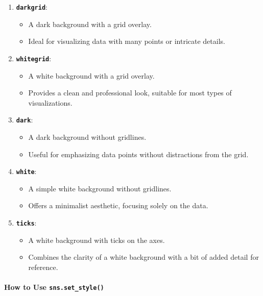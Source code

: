 \documentclass[
  letterpaper,
  DIV=11,
  numbers=noendperiod]{scrreprt}
\let\oldparagraph\paragraph
\renewcommand{\paragraph}[1]{\oldparagraph{#1}\mbox{}}
\providecommand{\tightlist}{%
  \setlength{\itemsep}{0pt}\setlength{\parskip}{0pt}}\usepackage{longtable,booktabs,array}
\begin{document}
\begin{enumerate}
\def\labelenumi{\arabic{enumi}.}
\tightlist
\item
  \textbf{\texttt{darkgrid}}:

  \begin{itemize}
  \tightlist
  \item
    A dark background with a grid overlay.
  \item
    Ideal for visualizing data with many points or intricate details.
  \end{itemize}
\item
  \textbf{\texttt{whitegrid}}:

  \begin{itemize}
  \tightlist
  \item
    A white background with a grid overlay.
  \item
    Provides a clean and professional look, suitable for most types of
    visualizations.
  \end{itemize}
\item
  \textbf{\texttt{dark}}:

  \begin{itemize}
  \tightlist
  \item
    A dark background without gridlines.
  \item
    Useful for emphasizing data points without distractions from the
    grid.
  \end{itemize}
\item
  \textbf{\texttt{white}}:

  \begin{itemize}
  \tightlist
  \item
    A simple white background without gridlines.
  \item
    Offers a minimalist aesthetic, focusing solely on the data.
  \end{itemize}
\item
  \textbf{\texttt{ticks}}:

  \begin{itemize}
  \tightlist
  \item
    A white background with ticks on the axes.
  \item
    Combines the clarity of a white background with a bit of added
    detail for reference.
  \end{itemize}
\end{enumerate}

\hypertarget{how-to-use-sns.set_style}{%
\paragraph{\texorpdfstring{How to Use
\texttt{sns.set\_style()}}{How to Use sns.set\_style()}}\label{how-to-use-sns.set_style}}
\end{document}
